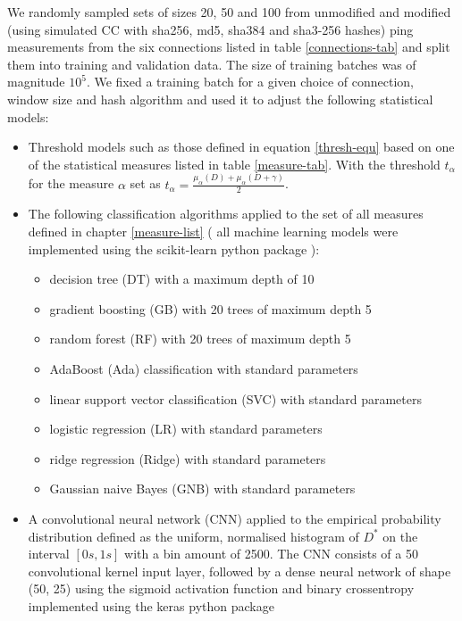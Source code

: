 \documentclass[12pt,a4paper,automark, toc=bib]{scrreprt}
\theoremstyle{definition}
\begin{document}
			We randomly sampled sets of sizes 20, 50 and 100 from unmodified and modified (using simulated CC with sha256, md5, sha384 and sha3-256 hashes) ping measurements from the six connections listed in table \ref{connections-tab} and split them into training and validation data. The size of training batches was of magnitude $10^5$. We fixed a training batch for a given choice of connection, window size and hash algorithm and used it to adjust the following statistical models:
			\begin{itemize}
				\item Threshold models such as those defined in equation \ref{thresh-equ} based on one of the statistical measures listed in table \ref{measure-tab}. With the threshold $t_{\alpha}$ for the measure $\alpha$ set as $t_\alpha = \frac{\mu_\alpha(D) + \mu_\alpha(D + \gamma)}{2}$.
				\item The following classification algorithms applied to the set of all measures defined in chapter \ref{measure-list} (
				all machine learning models were implemented using the scikit-learn python package \cite{Pedregosa2011}):
				\begin{itemize}
					\item decision tree (DT) with a maximum depth of 10
					\item gradient boosting (GB) with 20 trees of maximum depth 5 
					\item random forest (RF) with 20 trees of maximum depth 5
					\item AdaBoost (Ada) classification with standard parameters
					\item linear support vector classification (SVC) with standard parameters
					\item logistic regression (LR) with standard parameters
					\item ridge regression (Ridge) with standard parameters
					\item Gaussian naive Bayes (GNB) with standard parameters
					
				\end{itemize}
				\item A convolutional neural network (CNN) applied to the empirical probability distribution defined as the uniform, normalised histogram of $D^*$ on the interval $[0 s, 1 s]$ with a bin amount of 2500. The CNN consists of a 50 convolutional kernel input layer, followed by a dense neural network of shape (50, 25) using the sigmoid activation function and binary crossentropy implemented using the keras python package \cite{keras}
			\end{itemize}
\end{document}
